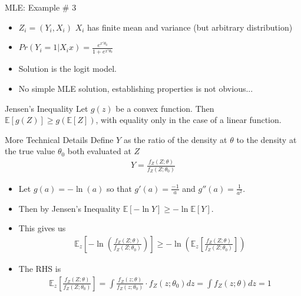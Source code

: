 \documentclass[aspectratio=169]{beamer}
\begin{document}
\begin{frame}{MLE: Example \# 3}
\begin{itemize}
\item $Z_i = (Y_i, X_i)$  $X_i$ has finite mean and variance (but arbitrary distribution)
\item $Pr(Y_i=1 | X_i  x) =  \frac{e^{x' \theta_0}}{1+ e^{x'\theta_0}}$
\item Solution is the \alert{logit} model.
\item No simple MLE solution, establishing properties is not obvious...
\end{itemize}
\end{frame}

\begin{frame}{Jensen's Inequality}
Let $g(z)$ be a convex function. Then $\mathbb { E }[g(Z)] \geq g(\mathbb { E }[Z])$, with equality only in the case of a linear function.
\end{frame}

\begin{frame}{More Technical Details}
Define $Y$ as the ratio of the density at $\theta$ to the density at the true value $\theta_0$ both evaluated at $Z$
\begin{align*}
Y = \frac{f_Z(Z;\theta)}{f_Z(Z;\theta_0)}
\end{align*}
\begin{itemize}
\item Let $g(a) = -\ln(a)$ so that $g'(a) = \frac{-1}{a}$ and $g''(a) =\frac{1}{a^2}$.
\item Then by \alert{Jensen's Inequality} $\mathbb{E}[- \ln Y] \geq - \ln \mathbb{E}[Y]$.
\item This gives us
\begin{align*}
\mathbb { E }_z \left[ - \ln \left( \frac { f _ { Z } ( Z ; \theta ) } { f _ { Z } \left( Z ; \theta _ { 0 } \right) } \right) \right] \geq - \ln \left( \mathbb { E }_z \left[ \frac { f _ { Z } ( Z ; \theta ) } { f _ { Z } \left( Z ; \theta _ { 0 } \right) } \right] \right)
\end{align*}
\item The RHS is
\begin{align*}
\mathbb { E }_z \left[ \frac { f _ { Z } ( Z ; \theta ) } { f _ { Z } \left( Z ; \theta _ { 0 } \right) } \right] = \int \frac { f _ { Z } ( z ; \theta ) } { f _ { Z } \left( z ; \theta _ { 0 } \right) } \cdot f _ { Z } \left( z ; \theta _ { 0 } \right) d z = \int f _ { Z } ( z ; \theta ) d z = 1
\end{align*}
\end{itemize}
\end{frame}
\end{document}
